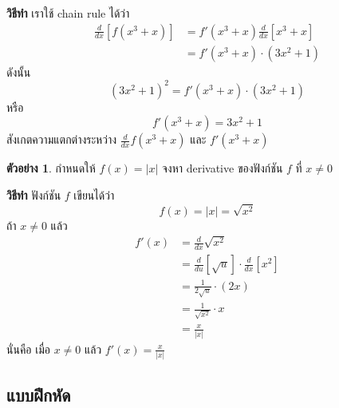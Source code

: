 \documentclass[
]{book}
\theoremstyle{definition}
\theoremstyle{definition}
\newtheorem{example}{ตัวอย่าง}[chapter]
\theoremstyle{definition}
\theoremstyle{definition}
\theoremstyle{remark}
\begin{document}
\textbf{วิธีทำ} เราใช้ chain rule ได้ว่า \begin{equation}   \begin{aligned}
    \frac{d}{dx}[f(x^3+x)]
    &= f'(x^3+x) \frac{d}{dx} [x^3+x] \\
    &= f'(x^3+x) \cdot (3x^2+1)
  \end{aligned} \end{equation} ดังนั้น \[(3x^2+1)^2 = f'(x^3+x)\cdot(3x^2+1)\] หรือ
\[f'(x^3+x) = 3x^2+1\] สังเกตความแตกต่างระหว่าง
\(\displaystyle \frac{d}{dx} f(x^3+x)\) และ \(f'(x^3+x)\)

\begin{example}
กำหนดให้ \(f(x) = |x|\) จงหา derivative ของฟังก์ชัน \(f\) ที่ \(x \ne 0\)
\end{example}

\textbf{วิธีทำ} ฟังก์ชัน \(f\) เขียนได้ว่า \[f(x) = |x| = \sqrt{x^2}\] ถ้า \(x\ne 0\) แล้ว
\begin{equation}   \begin{aligned}
    f'(x) &= \frac{d}{dx} \sqrt{x^2} \\
          &= \frac{d}{du} [\sqrt{u}] \cdot \frac{d}{dx} [x^2] \\
          &= \frac{1}{2\sqrt{u}} \cdot (2x) \\
          &= \frac{1}{\sqrt{x^2}} \cdot x \\
          &= \frac{x}{|x|}
  \end{aligned} \end{equation} นั่นคือ เมื่อ \(x\ne 0\) แล้ว
\(\displaystyle f'(x) = \frac{x}{|x|}\)

\subsection{แบบฝึกหัด}\label{uxe41uxe1auxe1auxe1duxe01uxe2buxe14}
\end{document}
